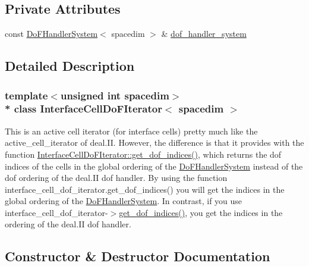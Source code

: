 \subsection*{Private Attributes}
\begin{DoxyCompactItemize}
\item 
const \hyperlink{class_do_f_handler_system}{Do\+F\+Handler\+System}$<$ spacedim $>$ \& \hyperlink{class_interface_cell_do_f_iterator_a62045b61faee901392a7326b624d2b02}{dof\+\_\+handler\+\_\+system}
\end{DoxyCompactItemize}


\subsection{Detailed Description}
\subsubsection*{template$<$unsigned int spacedim$>$\\*
class Interface\+Cell\+Do\+F\+Iterator$<$ spacedim $>$}

This is an active cell iterator (for interface cells) pretty much like the active\+\_\+cell\+\_\+iterator of deal.\+II. However, the difference is that it provides with the function \hyperlink{class_interface_cell_do_f_iterator_a7cd69c855243c0d8fb5df97911411edd}{Interface\+Cell\+Do\+F\+Iterator\+::get\+\_\+dof\+\_\+indices()}, which returns the dof indices of the cells in the global ordering of the \hyperlink{class_do_f_handler_system}{Do\+F\+Handler\+System} instead of the dof ordering of the deal.\+II dof handler. By using the function interface\+\_\+cell\+\_\+dof\+\_\+iterator.\+get\+\_\+dof\+\_\+indices() you will get the indices in the global ordering of the \hyperlink{class_do_f_handler_system}{Do\+F\+Handler\+System}. In contrast, if you use interface\+\_\+cell\+\_\+dof\+\_\+iterator-\/$>$\hyperlink{class_interface_cell_do_f_iterator_a7cd69c855243c0d8fb5df97911411edd}{get\+\_\+dof\+\_\+indices()}, you get the indices in the ordering of the deal.\+II dof handler. 

\subsection{Constructor \& Destructor Documentation}
